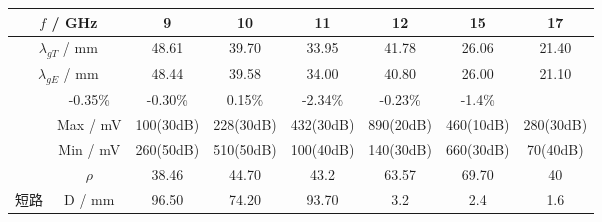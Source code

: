 \documentclass[a4paper]{article}
\begin{document}
\begin{table}[!h]
	\begin{tabular}{|c|c|c|c|c|c|c|c|}
		\hline
		\multicolumn{2}{|c|}{$f$ / GHz}                               & 9                              & 10                            & 11                            & 12                            & 15                            & 17                                                          \\ \hline
		\multicolumn{2}{|c|}{$\lambda_{gT}$ / mm}                     & 48.61                          & 39.70                         & 33.95                         & 41.78                         & 26.06                         & 21.40                                                       \\ \hline
		\multicolumn{2}{|c|}{$\lambda_{gE}$ / mm}                     & 48.44                          & 39.58                         & 34.00                         & 40.80                         & 26.00                         & 21.10                                                       \\ \hline
		\rowcolor[HTML]{EFEFEF}
		\multicolumn{2}{|c|}{\cellcolor[HTML]{EFEFEF}$\lambda_g$误差} & -0.35\%                        & -0.30\%                       & 0.15\%                        & -2.34\%                       & -0.23\%                       & -1.4\%                                                      \\ \hline
		                                                              & Max / mV                       & 100(30dB)                     & 228(30dB)                     & 432(30dB)                     & 890(20dB)                     & 460(10dB)                     & 280(30dB)                   \\ \cline{2-8}
		                                                              & Min / mV                       & 260(50dB)                     & 510(50dB)                     & 100(40dB)                     & 140(30dB)                     & 660(30dB)                     & 70(40dB)                    \\ \cline{2-8}
		                                                              & \cellcolor[HTML]{EFEFEF}$\rho$ & \cellcolor[HTML]{EFEFEF}38.46 & \cellcolor[HTML]{EFEFEF}44.70 & \cellcolor[HTML]{EFEFEF}43.2  & \cellcolor[HTML]{EFEFEF}63.57 & \cellcolor[HTML]{EFEFEF}69.70 & \cellcolor[HTML]{EFEFEF}40  \\ \cline{2-8}
		\multirow{-4}{*}{短路}                                        & \cellcolor[HTML]{EFEFEF}D / mm & \cellcolor[HTML]{EFEFEF}96.50 & \cellcolor[HTML]{EFEFEF}74.20 & \cellcolor[HTML]{EFEFEF}93.70 & \cellcolor[HTML]{EFEFEF}3.2   & \cellcolor[HTML]{EFEFEF}2.4   & \cellcolor[HTML]{EFEFEF}1.6 \\ \hline

\end{tabular}
\end{table}
\end{document}

